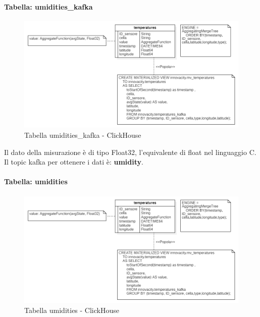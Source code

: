 \paragraph{Tabella: umidities\_kafka}
\begin{figure}[H]
    \centering
    \includegraphics[width=1\textwidth]{../Images/SpecificaTecnica/temperatures.PNG}
    \caption{Tabella umidities\_kafka - ClickHouse}
    \label{fig:umidities_kafka}
  \end{figure}
Il dato della misurazione è di tipo Float32, l’equivalente di float nel linguaggio C. Il topic
kafka per ottenere i dati è: \textbf{umidity}.
\paragraph{Tabella: umidities}
\begin{figure}[H]
    \centering
    \includegraphics[width=1\textwidth]{../Images/SpecificaTecnica/temperatures.PNG}
    \caption{Tabella umidities - ClickHouse}
    \label{fig:umidities}
  \end{figure}
